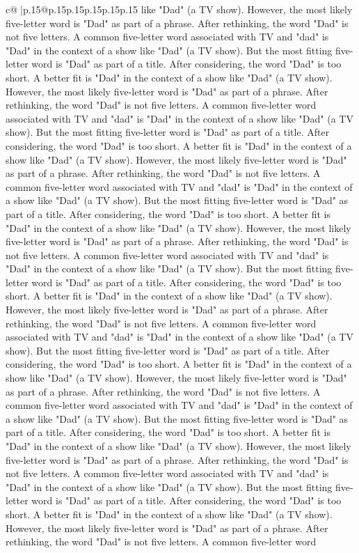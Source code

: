 \documentclass{article}
\begin{document}
{\begin{supertabular}{c@{$\;$}|p{.15\linewidth}@{}p{.15\linewidth}p{.15\linewidth}p{.15\linewidth}p{.15\linewidth}p{.15\linewidth}}
{{{like "Dad" (a TV show). However, the most likely five{-}letter word is "Dad" as part of a phrase. After rethinking, the word "Dad" is not five letters. A common five{-}letter word associated with TV and "dad" is "Dad" in the context of a show like "Dad" (a TV show). But the most fitting five{-}letter word is "Dad" as part of a title. After considering, the word "Dad" is too short. A better fit is "Dad" in the context of a show like "Dad" (a TV show). However, the most likely five{-}letter word is "Dad" as part of a phrase. After rethinking, the word "Dad" is not five letters. A common five{-}letter word associated with TV and "dad" is "Dad" in the context of a show like "Dad" (a TV show). But the most fitting five{-}letter word is "Dad" as part of a title. After considering, the word "Dad" is too short. A better fit is "Dad" in the context of a show like "Dad" (a TV show). However, the most likely five{-}letter word is "Dad" as part of a phrase. After rethinking, the word "Dad" is not five letters. A common five{-}letter word associated with TV and "dad" is "Dad" in the context of a show like "Dad" (a TV show). But the most fitting five{-}letter word is "Dad" as part of a title. After considering, the word "Dad" is too short. A better fit is "Dad" in the context of a show like "Dad" (a TV show). However, the most likely five{-}letter word is "Dad" as part of a phrase. After rethinking, the word "Dad" is not five letters. A common five{-}letter word associated with TV and "dad" is "Dad" in the context of a show like "Dad" (a TV show). But the most fitting five{-}letter word is "Dad" as part of a title. After considering, the word "Dad" is too short. A better fit is "Dad" in the context of a show like "Dad" (a TV show). However, the most likely five{-}letter word is "Dad" as part of a phrase. After rethinking, the word "Dad" is not five letters. A common five{-}letter word associated with TV and "dad" is "Dad" in the context of a show like "Dad" (a TV show). But the most fitting five{-}letter word is "Dad" as part of a title. After considering, the word "Dad" is too short. A better fit is "Dad" in the context of a show like "Dad" (a TV show). However, the most likely five{-}letter word is "Dad" as part of a phrase. After rethinking, the word "Dad" is not five letters. A common five{-}letter word associated with TV and "dad" is "Dad" in the context of a show like "Dad" (a TV show). But the most fitting five{-}letter word is "Dad" as part of a title. After considering, the word "Dad" is too short. A better fit is "Dad" in the context of a show like "Dad" (a TV show). However, the most likely five{-}letter word is "Dad" as part of a phrase. After rethinking, the word "Dad" is not five letters. A common five{-}letter word associated with TV and "dad" is "Dad" in the context of a show like "Dad" (a TV show). But the most fitting five{-}letter word is "Dad" as part of a title. After considering, the word "Dad" is too short. A better fit is "Dad" in the context of a show like "Dad" (a TV show). However, the most likely five{-}letter word is "Dad" as part of a phrase. After rethinking, the word "Dad" is not five letters. A common five{-}letter word }}}
\end{supertabular}}
\end{document}
